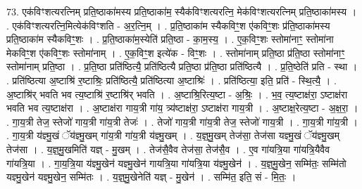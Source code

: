 \documentclass[17pt]{extarticle}
\begin{document}
73. एक॑विꣳशत्यरत्निम् प्रति॒ष्ठाका॑मस्य प्रति॒ष्ठाका॑म॒ स्यैक॑विꣳशत्यरत्नि॒ मेक॑विꣳशत्यरत्निम् प्रति॒ष्ठाका॑मस्य । . एक॑विꣳशत्यरत्नि॒मित्येक॑विꣳशति - अ॒र॒त्नि॒म् । . प्र॒ति॒ष्ठाका॑म स्यैकविꣳ॒॒श ए॑कविꣳ॒॒शः प्र॑ति॒ष्ठाका॑मस्य प्रति॒ष्ठाका॑म स्यैकविꣳ॒॒शः । . प्र॒ति॒ष्ठाका॑म॒स्येति॑ प्रति॒ष्ठा - का॒म॒स्य॒ । . ए॒क॒विꣳ॒॒शः स्तोमा॑नाꣳ॒॒ स्तोमा॑ना मेकविꣳ॒॒श ए॑कविꣳ॒॒शः स्तोमा॑नाम् । . ए॒क॒विꣳ॒॒श इत्ये॑क - विꣳ॒॒शः । . स्तोमा॑नाम् प्रति॒ष्ठा प्र॑ति॒ष्ठा स्तोमा॑नाꣳ॒॒ स्तोमा॑नाम् प्रति॒ष्ठा । . प्र॒ति॒ष्ठा प्रति॑ष्ठित्यै॒ प्रति॑ष्ठित्यै प्रति॒ष्ठा प्र॑ति॒ष्ठा प्रति॑ष्ठित्यै । . प्र॒ति॒ष्ठेति॑ प्रति - स्था । . प्रति॑ष्ठित्या अ॒ष्टाश्रि॑ र॒ष्टाश्रिः॒ प्रति॑ष्ठित्यै॒ प्रति॑ष्ठित्या अ॒ष्टाश्रिः॑ । . प्रति॑ष्ठित्या॒ इति॒ प्रति॑ - स्थि॒त्यै॒ । . अ॒ष्टाश्रि॑र् भवति भव त्य॒ष्टाश्रि॑ र॒ष्टाश्रि॑र् भवति । . अ॒ष्टाश्रि॒रित्य॒ष्टा - अ॒श्रिः॒ । . भ॒व॒ त्य॒ष्टाक्ष॑रा॒ ऽष्टाक्ष॑रा भवति भव त्य॒ष्टाक्ष॑रा । . अ॒ष्टाक्ष॑रा गाय॒त्री गा॑य॒ त्र्य॑ष्टाक्ष॑रा॒ ऽष्टाक्ष॑रा गाय॒त्री । . अ॒ष्टाक्ष॒रेत्य॒ष्टा - अ॒क्ष॒रा॒ । . गा॒य॒त्री तेज॒ स्तेजो॑ गाय॒त्री गा॑य॒त्री तेजः॑ । . तेजो॑ गाय॒त्री गा॑य॒त्री तेज॒ स्तेजो॑ गाय॒त्री । . गा॒य॒त्री गा॑य॒त्री । . गा॒य॒त्री य॑ज्ञ्मु॒खं ॅय॑ज्ञ्मु॒खम् गा॑य॒त्री गा॑य॒त्री य॑ज्ञ्मु॒खम् । . य॒ज्ञ्॒मु॒खम् तेज॑सा॒ तेज॑सा यज्ञ्मु॒खं ॅय॑ज्ञ्मु॒खम् तेज॑सा । . य॒ज्ञ्॒मु॒खमिति॑ यज्ञ् - मु॒खम् । . तेज॑सै॒वैव तेज॑सा॒ तेज॑सै॒व । . ए॒व गा॑यत्रि॒या गा॑यत्रि॒यैवैव गा॑यत्रि॒या । . गा॒य॒त्रि॒या य॑ज्ञ्मु॒खेन॑ यज्ञ्मु॒खेन॑ गायत्रि॒या गा॑यत्रि॒या य॑ज्ञ्मु॒खेन॑ । . य॒ज्ञ्॒मु॒खेन॒ सम्मि॑तः॒ सम्मि॑तो यज्ञ्मु॒खेन॑ यज्ञ्मु॒खेन॒ सम्मि॑तः । . य॒ज्ञ्॒मु॒खेनेति॑ यज्ञ् - मु॒खेन॑ । . सम्मि॑त॒ इति॒ सं - मि॒तः॒ । \newline
\end{document}
